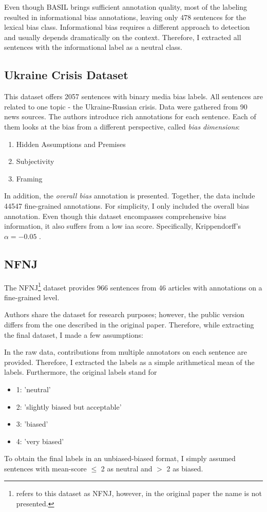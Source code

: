Even though BASIL brings sufficient annotation quality, most of the labeling resulted in informational bias annotations, leaving only 478 sentences for the lexical bias class. Informational bias requires a different approach to detection \cite{van2020context} and usually depends dramatically on the context. Therefore, I extracted all sentences with the informational label as a neutral class.




\subsection{Ukraine Crisis Dataset}
This dataset \cite{farber2020multidimensional} offers 2057 sentences with binary media bias labels. All sentences are related to one topic - the Ukraine-Russian crisis. Data were gathered from 90 news sources.
\newpage
The authors introduce rich annotations for each sentence. Each of them looks at the bias from a different perspective, called \textit{bias dimensions}:
\begin{enumerate}
    \item Hidden Assumptions and Premises
    \item Subjectivity
    \item Framing
\end{enumerate}
In addition, the \textit{overall bias} annotation is presented. Together, the data include 44547 fine-grained annotations. For simplicity, I only included the overall bias annotation.
Even though this dataset encompasses comprehensive bias information, it also suffers from a low \Gls{iaa} score. Specifically, Krippendorff’s $\alpha = -0.05$ \cite{krippendorff2011computing}.



\subsection{NFNJ}
The NFNJ\footnote{\cite{farber2020multidimensional} refers to this dataset as NFNJ, however, in the original paper \cite{lim2018understanding} the name is not presented.} dataset provides 966 sentences from 46 articles with annotations on a fine-grained level.

Authors share the dataset for research purposes; however, the public version differs from the one described in the original paper. Therefore, while extracting the final dataset, I made a few assumptions:

In the raw data, contributions from multiple annotators on each sentence are provided. Therefore, I extracted the labels as a simple arithmetical mean of the labels. Furthermore, the original labels stand for 
\begin{itemize}
    \item 1: 'neutral'
    \item 2: 'slightly biased but acceptable'
    \item 3: 'biased'
    \item 4: 'very biased'
\end{itemize}
To obtain the final labels in an unbiased-biased format, I simply assumed sentences with mean-score $\leq$ 2 as neutral and $>$ 2 as biased.

